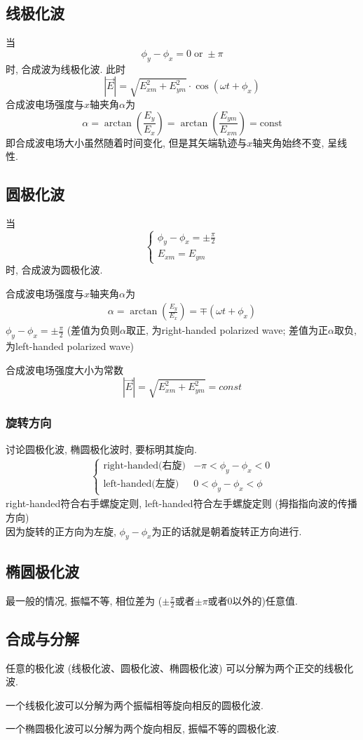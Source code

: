 \documentclass[a4paper]{report}
\begin{document}
\subsection{线极化波}
当
$$\phi_y-\phi_x=0\;\text{or}\;\pm\pi$$
时, 合成波为线极化波. 
此时$$|\vec{E} |=\sqrt{E_{xm}^2+E_{ym}^2}\cdot \cos(\omega t+\phi_x)$$
合成波电场强度与$x$轴夹角$\alpha$为
$$\alpha=\arctan(\frac{E_y}{E_x})
=\arctan(\frac{E_{ym}}{E_{xm}})
=\text{const}$$
即合成波电场大小虽然随着时间变化, 但是其矢端轨迹与$x$轴夹角始终不变, 呈线性. 
\subsection{圆极化波}
当
$$\begin{cases}
    \phi_y-\phi_x=\pm\frac{\pi}{2}\\
    E_{xm}=E_{ym}
\end{cases}$$
时, 合成波为圆极化波. 
\par 合成波电场强度与$x$轴夹角$\alpha$为
\begin{align*}
    \alpha=\arctan(\frac{E_y}{E_x})=\mp(\omega t+\phi_x)
\end{align*}
$\phi_y-\phi_x=\pm\frac{\pi}{2}$ (差值为负则$\alpha$取正, 为right-handed polarized wave; 差值为正$\alpha$取负,为left-handed polarized wave)
\par 合成波电场强度大小为常数
$$|\vec{E} |=\sqrt{E_{xm}^2+E_{ym}^2}=const$$
\subsubsection{旋转方向}
讨论圆极化波, 椭圆极化波时, 要标明其旋向. 
\begin{align*}
    \begin{cases}
        \text{right-handed(右旋)}&-\pi<\phi_y-\phi_x<0\\
        \text{left-handed(左旋)}&0<\phi_y-\phi_x<\phi
    \end{cases}
\end{align*}
right-handed符合右手螺旋定则, left-handed符合左手螺旋定则 (拇指指向波的传播方向)\\
因为旋转的正方向为左旋, $\phi_y-\phi_x$为正的话就是朝着旋转正方向进行. 
\subsection{椭圆极化波}
最一般的情况, 振幅不等, 相位差为 ($\pm\frac{\pi}{2}$或者$\pm\pi$或者$0$以外的)任意值. 
\subsection{合成与分解}
任意的极化波 (线极化波、圆极化波、椭圆极化波) 可以分解为两个正交的线极化波. 
\par 一个线极化波可以分解为两个振幅相等旋向相反的圆极化波. 
\par 一个椭圆极化波可以分解为两个旋向相反, 振幅不等的圆极化波. 
\end{document}
